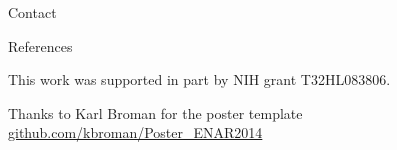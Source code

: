 \documentclass[final,plain]{beamer}
\newlength{\sepwid}
\newlength{\onecolwid}
\newlength{\twocolwid}
\begin{document}
\begin{frame}[t]
\begin{columns}[t]
\begin{column}{\twocolwid}
\begin{columns}[t]
\begin{column}{\onecolwid}
\begin{block}{Contact}
    \end{block}

      \begin{block}{References} 

        {\small 
	 
       	
         } 
      \end{block} 

    \vspace{40pt}
    {\rmfamily \footnotesize
    \centerline{This work was supported in part by NIH grant T32HL083806.}}

    \vspace{10pt}
    {\rmfamily \footnotesize
    \centerline{Thanks to Karl Broman for the poster template \href{https://github.com/kbroman/Poster_ENAR2014}{github.com/kbroman/Poster\_ENAR2014}}}


      \end{column}
  \end{columns}
  \end{column}


  \begin{column}{\sepwid}\end{column} %

\end{columns}


\end{frame}
\end{document}
